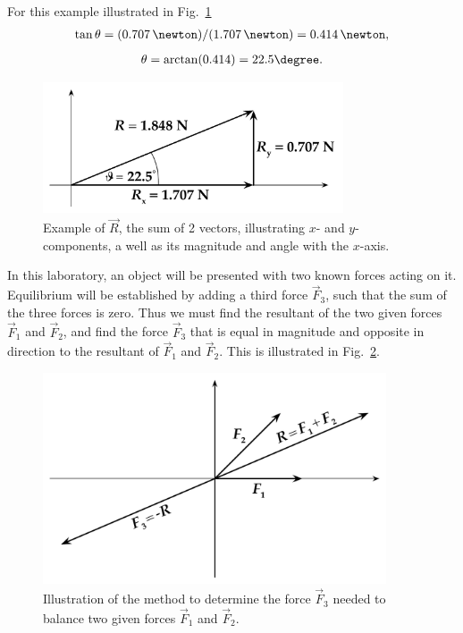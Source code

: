 For this example illustrated in Fig.~\ref{M01Fig04}
\begin{align} %
  \tan \theta = (0.707\,\newton) / (1.707\,\newton) = 0.414\,\newton,
\end{align}
\begin{align} %
  \theta = \arctan(0.414) = 22.5\degree.
\end{align}

\begin{figure}%
  \begin{center}
    \includegraphics[width=3.5in]{Experiment01Figures/Figure04.pdf}
  \end{center}
  \caption{Example of $\vec{R}$, the sum of 2 vectors, illustrating $x$- and $y$-components, a well as its magnitude and angle with the $x$-axis.}
  \label{M01Fig04} 
\end{figure}

In this laboratory, an object will be presented with two known forces acting on it.  Equilibrium will be established by adding a third force $\vec{F}_3$, such that the sum of the three forces is zero. Thus we must find the resultant of the two given forces $\vec{F}_1$ and $\vec{F}_2$, and find the force $\vec{F}_3$ that is equal in magnitude and opposite in direction to the resultant of $\vec{F}_1$ and $\vec{F}_2$.  This is illustrated in Fig.~\ref{M01Fig05}.

\begin{figure}%
  \begin{center}
    \includegraphics[width=4.0in]{Experiment01Figures/Figure05.pdf}
  \end{center}
  \caption{Illustration of the method to determine the force $\vec{F}_{3}$ needed to balance two given forces $\vec{F}_{1}$ and $\vec{F}_{2}$.}
  \label{M01Fig05}
\end{figure}

